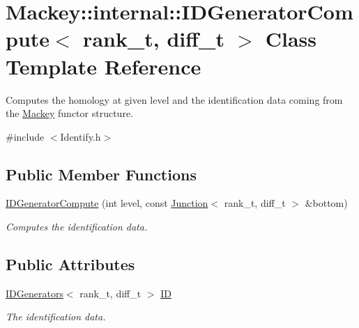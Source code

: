 \hypertarget{classMackey_1_1internal_1_1IDGeneratorCompute}{}\section{Mackey\+:\+:internal\+:\+:I\+D\+Generator\+Compute$<$ rank\+\_\+t, diff\+\_\+t $>$ Class Template Reference}
\label{classMackey_1_1internal_1_1IDGeneratorCompute}


Computes the homology at given level and the identification data coming from the \hyperlink{namespaceMackey}{Mackey} functor structure.  




{\ttfamily \#include $<$Identify.\+h$>$}

\subsection*{Public Member Functions}
\begin{DoxyCompactItemize}
\item 
\hyperlink{classMackey_1_1internal_1_1IDGeneratorCompute_a39700cf08ba57766c87498975b28ec62}{I\+D\+Generator\+Compute} (int level, const \hyperlink{classMackey_1_1Junction}{Junction}$<$ rank\+\_\+t, diff\+\_\+t $>$ \&bottom)
\begin{DoxyCompactList}\small\item\em Computes the identification data. \end{DoxyCompactList}\end{DoxyCompactItemize}
\subsection*{Public Attributes}
\begin{DoxyCompactItemize}
\item 
\hyperlink{classMackey_1_1IDGenerators}{I\+D\+Generators}$<$ rank\+\_\+t, diff\+\_\+t $>$ \hyperlink{classMackey_1_1internal_1_1IDGeneratorCompute_a6a497058759c758e9f3c895abaa5d837}{ID}
\begin{DoxyCompactList}\small\item\em The identification data. \end{DoxyCompactList}\end{DoxyCompactItemize}
